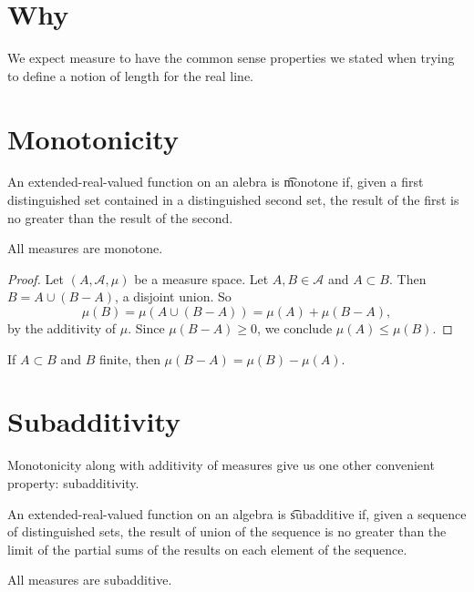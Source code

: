 

\section*{Why}

We expect measure to have the common sense properties we stated when trying to define a notion of length for the real line.

\section*{Monotonicity}

An extended-real-valued function on an alebra is \t{monotone} if, given a first distinguished set contained in a distinguished second set, the result of the first is no greater than the result of the second.

\begin{proposition}
All measures are monotone.
\end{proposition}

\begin{proof}Let $(A, \mathcal{A} , \mu )$ be a measure space.
Let $A, B \in \mathcal{A} $ and $A \subset B$.
Then $B = A \cup (B - A)$, a disjoint union.
So
\[
\mu (B) = \mu (A \cup (B - A))= \mu (A) + \mu (B - A),
\]
by the additivity of $\mu $.
Since $\mu (B - A) \geq 0$,
we conclude $\mu (A) \leq \mu (B)$.\end{proof}
\begin{proposition}
If $A \subset B$ and $B$ finite, then $\mu (B - A) = \mu (B) - \mu (A)$.
\end{proposition}

\section*{Subadditivity}

Monotonicity along with additivity of measures give us one other convenient property: subadditivity.

An extended-real-valued function on an algebra is \t{subadditive} if, given a sequence of distinguished sets, the result of union of the sequence is no greater than the limit of the partial sums of the results on each element of the sequence.

\begin{proposition}
All measures are subadditive.
\end{proposition}

